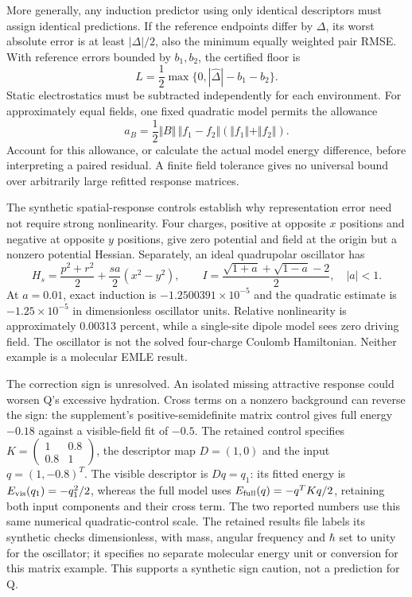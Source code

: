 \documentclass{article}
\begin{document}
More generally, any induction predictor using only identical descriptors must assign identical predictions. If the reference endpoints differ by $\Delta$, its worst absolute error is at least $|\Delta|/2$, also the minimum equally weighted pair RMSE. With reference errors bounded by $b_1,b_2$, the certified floor is
\begin{equation*}
L=\frac12\max\{0,|\widehat\Delta|-b_1-b_2\}.
\end{equation*}
Static electrostatics must be subtracted independently for each environment. For approximately equal fields, one fixed quadratic model permits the allowance
\begin{equation*}
a_B=\frac12\Vert B\Vert\,\Vert f_1-f_2\Vert(\Vert f_1\Vert+\Vert f_2\Vert).
\end{equation*}
Account for this allowance, or calculate the actual model energy difference, before interpreting a paired residual. A finite field tolerance gives no universal bound over arbitrarily large refitted response matrices.

The synthetic spatial-response controls establish why representation error need not require strong nonlinearity. Four charges, positive at opposite $x$ positions and negative at opposite $y$ positions, give zero potential and field at the origin but a nonzero potential Hessian. Separately, an ideal quadrupolar oscillator has
\begin{equation*}
H_s=\frac{p^2+r^2}{2}+\frac{sa}{2}(x^2-y^2),\qquad
I=\frac{\sqrt{1+a}+\sqrt{1-a}-2}{2},\quad |a|<1.
\end{equation*}
At $a=0.01$, exact induction is $-1.2500391\times10^{-5}$ and the quadratic estimate is $-1.25\times10^{-5}$ in dimensionless oscillator units. Relative nonlinearity is approximately 0.00313 percent, while a single-site dipole model sees zero driving field. The oscillator is not the solved four-charge Coulomb Hamiltonian. Neither example is a molecular EMLE result.

The correction sign is unresolved. An isolated missing attractive response could worsen Q's excessive hydration. Cross terms on a nonzero background can reverse the sign: the supplement's positive-semidefinite matrix control gives full energy $-0.18$ against a visible-field fit of $-0.5$. The retained control specifies $K=\left(\begin{smallmatrix}1&0.8\\0.8&1\end{smallmatrix}\right)$, the descriptor map $D=(1,0)$ and the input $q=(1,-0.8)^T$. The visible descriptor is $Dq=q_1$: its fitted energy is $E_{\rm vis}(q_1)=-q_1^2/2$, whereas the full model uses $E_{\rm full}(q)=-q^TKq/2$, retaining both input components and their cross term. The two reported numbers use this same numerical quadratic-control scale. The retained results file labels its synthetic checks dimensionless, with mass, angular frequency and $\hbar$ set to unity for the oscillator; it specifies no separate molecular energy unit or conversion for this matrix example. This supports a synthetic sign caution, not a prediction for Q.
\end{document}
